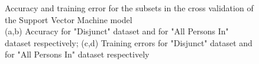 \documentclass[conference]{IEEEtran}
\begin{document}
\begin{figure}[ht!]
    \centering

    \quad
    \quad
    
    \quad
    \quad

    \caption{
        \color{baptiste}
        Accuracy and training error for the subsets in the cross validation of the Support Vector Machine model \\ 
        (a,b) Accuracy for "Disjunct" dataset and for "All Persons In" dataset respectively;
        (c,d) Training errors for "Disjunct" dataset and for "All Persons In" dataset respectively
    }
    \label{fig:hyper:cv_SVM}
\end{figure}
\end{document}
